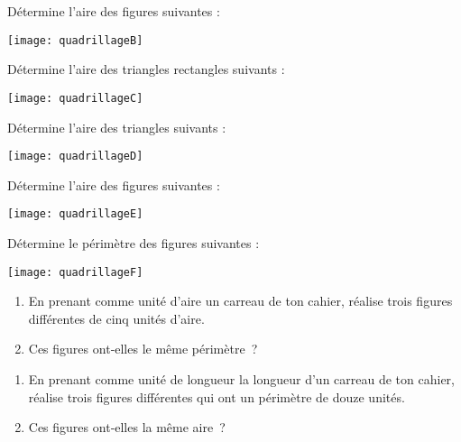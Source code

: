 \begin{exercice}
Détermine l'aire des figures suivantes :

\begin{center} \texttt{[image: quadrillageB]} \end{center}
\end{exercice}


\begin{exercice}
Détermine l'aire des triangles rectangles suivants :

\begin{center} \texttt{[image: quadrillageC]} \end{center}
\end{exercice}


\begin{exercice}
Détermine l'aire des triangles suivants :

\begin{center} \texttt{[image: quadrillageD]} \end{center}
\end{exercice}


\begin{exercice}
Détermine l'aire des figures suivantes :

\begin{center} \texttt{[image: quadrillageE]} \end{center}
\end{exercice}


\begin{exercice}
Détermine le périmètre des figures suivantes :

\begin{center} \texttt{[image: quadrillageF]} \end{center}
\end{exercice}


\begin{exercice}
\begin{enumerate}
 \item En prenant comme unité d'aire un carreau de ton cahier, réalise trois figures différentes de cinq unités d'aire.
 \item Ces figures ont‑elles le même périmètre ?
 \end{enumerate}
\end{exercice}

\begin{exercice}
\begin{enumerate}
 \item En prenant comme unité de longueur la longueur d'un carreau de ton cahier, réalise trois figures différentes qui ont un périmètre de douze unités.
 \item Ces figures ont‑elles la même aire ?
 \end{enumerate}
\end{exercice}

